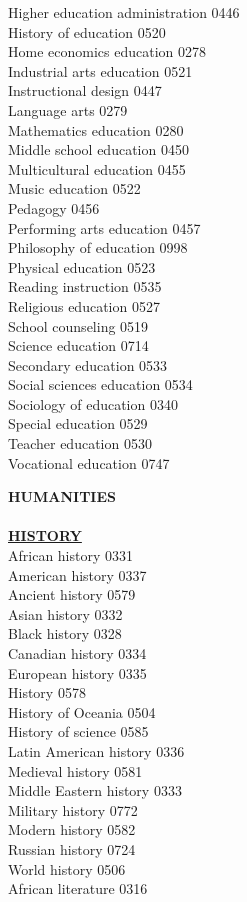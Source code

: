 \documentclass[9pt,twoside]{article}
\newcommand{\categoryheading}[1]{{\fontsize{8}{11}\selectfont \textbf{\uline{#1}}}}
\begin{document}
\begin{multicols}{3}
Higher education administration \hfill 0446 \\
History of education \hfill 0520 \\
Home economics education \hfill 0278 \\
Industrial arts education \hfill 0521 \\
Instructional design \hfill 0447 \\
Language arts \hfill 0279 \\
Mathematics education \hfill 0280 \\
Middle school education \hfill 0450 \\
Multicultural education \hfill 0455 \\
Music education \hfill 0522 \\
Pedagogy \hfill 0456 \\
Performing arts education \hfill 0457 \\
Philosophy of education \hfill 0998 \\
Physical education \hfill 0523 \\
Reading instruction \hfill 0535 \\
Religious education \hfill 0527 \\
School counseling \hfill 0519 \\
Science education \hfill 0714 \\
Secondary education \hfill 0533 \\
Social sciences education \hfill 0534 \\
Sociology of education \hfill 0340 \\
Special education \hfill 0529 \\
Teacher education \hfill 0530 \\
Vocational education \hfill 0747
\clearpage

\textbf{HUMANITIES} \\
\\
\categoryheading{HISTORY} \\
African history \hfill 0331 \\
American history \hfill 0337 \\
Ancient history \hfill 0579 \\
Asian history \hfill 0332 \\
Black history \hfill 0328 \\
Canadian history \hfill 0334 \\
European history \hfill 0335 \\
History \hfill 0578 \\
History of Oceania \hfill 0504 \\
History of science \hfill 0585 \\
Latin American history \hfill 0336 \\
Medieval history \hfill 0581 \\
Middle Eastern history \hfill 0333 \\
Military history \hfill 0772 \\
Modern history \hfill 0582 \\
Russian history \hfill 0724 \\
World history \hfill 0506 \\
African literature \hfill 0316


\end{multicols}
\end{document}
